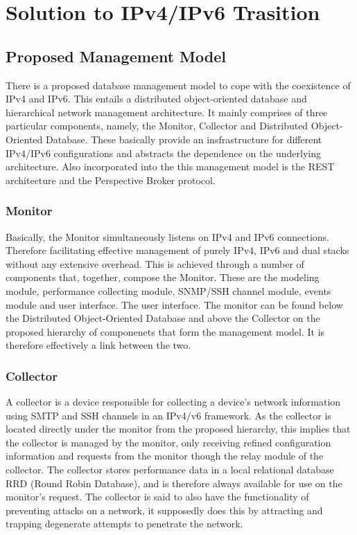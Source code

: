 
%
\section{Solution to IPv4/IPv6 Trasition}

\subsection{Proposed Management Model}
There is a proposed database management model to cope with the coexistence of IPv4 and IPv6. This entails a distributed object-oriented database and hierarchical network management architecture. It mainly comprises of three particular components, namely, the Monitor, Collector and Distributed Object-
Oriented Database. These basically provide an insfrastructure for different IPv4/IPv6 configurations and abstracts the dependence on the underlying architecture. Also incorporated into the this management model is the REST architecture and the Perspective Broker protocol. \cite{Zhao}

\subsubsection{Monitor}
Basically, the Monitor simultaneously listens on IPv4 and IPv6 connections. Therefore facilitating effective management of purely IPv4, IPv6 and dual stacks without any extensive overhead. This is achieved through a number of components that, together, compose the Monitor. These are the modeling module, performance
collecting module, SNMP/SSH channel module, events module and user interface. The user interface. The monitor can be found below the Distributed Object-Oriented Database and above the Collector on the proposed hierarchy of componenets that form the management model. It is therefore effectively a link between the two. \cite{Johnny}

\subsubsection{Collector}
A collector is a device responsible for collecting a device’s network information using SMTP and SSH channels in an IPv4/v6 framework. As the collector is located directly under the monitor from the proposed hierarchy, this implies that the collector is managed by the monitor, only receiving refined configuration information and requests from the monitor though the relay module of the collector. 
The collector stores performance data in a local relational database RRD (Round Robin Database), and is therefore always available for use on the monitor’s request.
The collector is said to also have the functionality of preventing attacks on a network, it supposedly does this by attracting and trapping degenerate attempts to penetrate the network. \cite{Baker}

